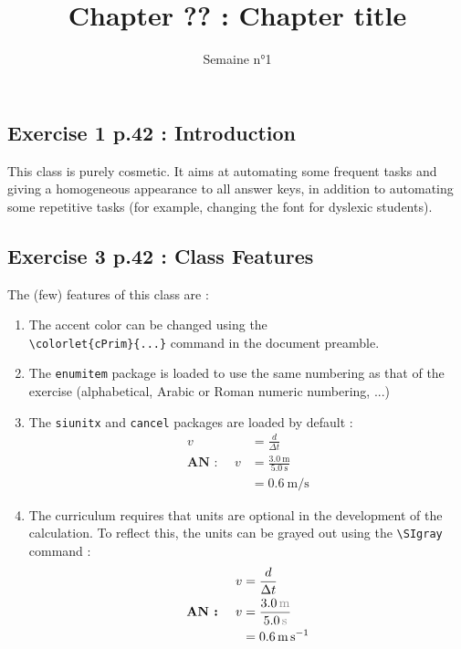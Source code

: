 \documentclass[code]{HSP-AnswerSheet}
\title{Chapter ?? : Chapter title}
\date{Semaine n°1}
\begin{document}
	\maketitle
	
	\begin{multicols*}{2}
		
		\subsection*{Exercise 1 p.42 : Introduction}
		This class is purely cosmetic. It aims at automating some frequent tasks and giving a homogeneous appearance to all answer keys, in addition to automating some repetitive tasks (for example, changing the font for dyslexic students).
		
		\subsection*{Exercise 3 p.42 : Class Features}
		The (few) features of this class are :
		\begin{enumerate}[label=\bfseries\alph*.]
			\item The accent color can be changed using the \\ \verb|\colorlet{cPrim}{...}| command in the document preamble.
			\item The \verb*|enumitem| package is loaded to use the same numbering as that of the exercise (alphabetical, Arabic or Roman numeric numbering, ...)
			\item The \verb*|siunitx| and \verb*|cancel| packages are loaded by default :
			\begin{align*}
				v&=\frac{d}{\Delta t}\\
					\textbf{AN : }\quad
				v&=\frac{ \SI{3.0}{\meter} }{ \SI{5.0}{\second} }\\
				 &=\SI{0.6}{\meter\per\second}
			\end{align*}
		
			\item The curriculum requires that units are optional in the development of the calculation. To reflect this, the units can be grayed out using the \verb|\SIgray| command :
			\begin{align*}
				v&=\frac{d}{\Delta t}\\
				\textbf{AN : }\quad
				v&=\frac{ \SIgray{3.0}{\meter} }{ \SIgray{5.0}{\second} }\\
				&=\SI{0.6}{\meter\per\second}
			\end{align*}
		\end{enumerate}
		

\end{multicols*}
\end{document}
